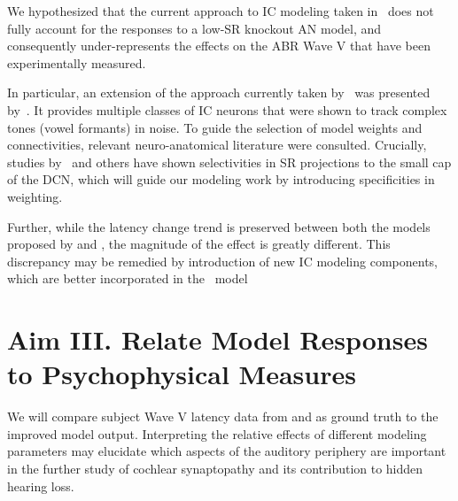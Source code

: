 We hypothesized that the current approach to IC modeling taken in~\cite{Verhulst2015Functional,Mehraei2016Auditory} does not fully account for the responses to a low-SR knockout AN model, and consequently under-represents the effects on the ABR Wave V that have been experimentally measured.  

In particular, an extension of the approach currently taken by~\cite{Verhulst2015Functional} was presented by~\cite{Carney2015Speech}.  It provides multiple classes of IC neurons that were shown to track complex tones (vowel formants) in noise.  To guide the selection of model weights and connectivities, relevant neuro-anatomical literature were consulted.  Crucially, studies by~\cite{Ryugo2008Projections} and others have shown selectivities in SR projections to the small cap of the DCN, which will guide  our modeling work by introducing specificities in weighting. 

Further, while the latency change trend is preserved between both the models proposed by \citeauthor{Zilany2014Updated} and \citeauthor{Verhulst2015Functional}, the magnitude of the effect is greatly different.  This discrepancy may be remedied by introduction of new IC modeling components, which are better incorporated in the~\cite{Zilany2014Updated} model

\section{Aim III. Relate Model Responses to Psychophysical Measures}  
We will compare subject Wave V latency data from \citeauthor{Mehraei2015Auditory} and \citeauthor{Mehraei2015Individual} as ground truth to the improved model output.  Interpreting the relative effects of different modeling parameters may elucidate which aspects of the auditory periphery are important in the further study of cochlear synaptopathy and its contribution to hidden hearing loss. 